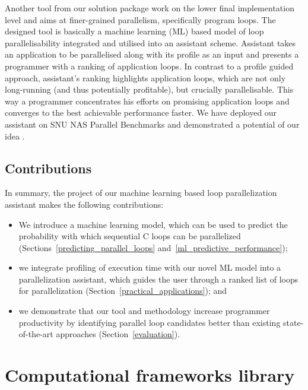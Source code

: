 \quad Another tool from our solution package work on the lower final implementation level and aims at finer-grained parallelism, specifically program loops. The designed tool is basically a machine learning (ML) based model of loop parallelisability integrated and utilised into an assistant scheme. Assistant takes an application to be parallelised along with its profile as an input and presents a programmer with a ranking of application loops. In contrast to a profile guided approach, assistant's ranking highlights application loops, which are not only long-running (and thus potentially profitable), but crucially parallelisable. This way a programmer concentrates his efforts on promising application loops and converges to the best achievable performance faster. We have deployed our assistant on SNU NAS Parallel Benchmarks \cite{snu-npb-benchmarks} \cite{nasa-parallel-benchmarks} and demonstrated a potential of our idea \cite{aiseps}.

\subsection{Contributions}
\quad In summary, the project of our machine learning based loop parallelization assistant makes the following contributions:
%
\begin{itemize}
\renewcommand\labelitemi{$\vartriangleright$}
\renewcommand\labelitemii{$\bullet$}
\item We introduce a machine learning model, which can be used to predict the probability with which sequential C loops can be parallelized (Sections~\ref{predicting_parallel_loops} and~\ref{ml_predictive_performance});
\item we integrate profiling of execution time with our novel ML model into a parallelization assistant, which guides the user through a ranked list of loops for parallelization (Section~\ref{practical_applications}); and
\item we demonstrate that our tool and methodology increase programmer productivity by identifying parallel loop candidates better than existing state-of-the-art approaches (Section~\ref{evaluation}).
\end{itemize}


\section{Computational frameworks library}
\label{introduction_frameworks}


